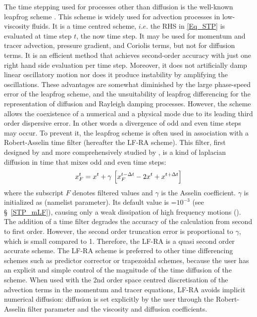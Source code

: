 \documentclass[NEMO_book]{subfiles}
\begin{document}
The time stepping used for processes other than diffusion is the well-known leapfrog
scheme \citep{Mesinger_Arakawa_Bk76}.  This scheme is widely used for advection 
processes in low-viscosity fluids. It is a time centred scheme, $i.e.$ 
the RHS in \eqref{Eq_STP} is evaluated at time step $t$, the now time step. 
It may be used for momentum and tracer advection, 
pressure gradient, and Coriolis terms, but not for diffusion terms.
It is an efficient method that achieves 
second-order accuracy with just one right hand side evaluation per time step. 
Moreover, it does not artificially damp linear oscillatory motion nor does it produce 
instability by amplifying the oscillations. These advantages are somewhat diminished 
by the large phase-speed error of the leapfrog scheme, and the unsuitability 
of leapfrog differencing for the representation of diffusion and Rayleigh 
damping processes. However, the scheme allows the coexistence of a numerical 
and a physical mode due to its leading third order dispersive error. In other words a 
divergence of odd and even time steps may occur. To prevent it, the leapfrog scheme 
is often used in association with a Robert-Asselin time filter (hereafter the LF-RA scheme). 
This filter, first designed by \citet{Robert_JMSJ66} and more comprehensively studied 
by \citet{Asselin_MWR72}, is a kind of laplacian diffusion in time that mixes odd and 
even time steps:
\begin{equation} \label{Eq_STP_asselin}
x_F^t  = x^t + \gamma \, \left[ x_F^{t-\Delta t} - 2 x^t + x^{t+\Delta t} \right]
\end{equation} 
where the subscript $F$ denotes filtered values and $\gamma$ is the Asselin 
coefficient. $\gamma$ is initialized as  (namelist parameter). 
Its default value is =$10^{-3}$ (see \S~\ref{STP_mLF}), 
causing only a weak dissipation of high frequency motions (\citep{Farge1987}). 
The addition of a time filter degrades the accuracy of the 
calculation from second to first order. However, the second order truncation 
error is proportional to $\gamma$, which is small compared to 1. Therefore, 
the LF-RA is a quasi second order accurate scheme. The LF-RA scheme 
is preferred to other time differencing schemes such as 
predictor corrector or trapezoidal schemes, because the user has an explicit 
and simple control of the magnitude of the time diffusion of the scheme. 
When used with the 2nd order space centred discretisation of the 
advection terms in the momentum and tracer equations, LF-RA avoids implicit 
numerical diffusion: diffusion is set explicitly by the user through the Robert-Asselin 
filter parameter and the viscosity and diffusion coefficients.
\end{document}
